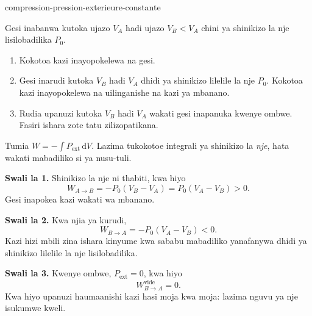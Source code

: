 \begin{exo}{compression-pression-exterieure-constante}

Gesi inabanwa kutoka ujazo $V_A$ hadi ujazo $V_B<V_A$ chini ya shinikizo la nje lisilobadilika $P_0$.

\begin{enumerate}
\item Kokotoa kazi inayopokelewa na gesi.
\item Gesi inarudi kutoka $V_B$ hadi $V_A$ dhidi ya shinikizo lilelile la nje $P_0$. Kokotoa kazi inayopokelewa na uilinganishe na kazi ya mbanano.
\item Rudia upanuzi kutoka $V_B$ hadi $V_A$ wakati gesi inapanuka kwenye ombwe. Fasiri ishara zote tatu zilizopatikana.
\end{enumerate}

\begin{indication}
Tumia $W=-\int P_{\mathrm{ext}}\,\mathrm{d}V$. Lazima tukokotoe integrali ya
shinikizo la \emph{nje}, hata wakati mabadiliko si ya nusu-tuli.
\end{indication}

\begin{solution}
\textbf{Swali la 1.} Shinikizo la nje ni thabiti, kwa hiyo
\[
W_{A\to B}=-P_0(V_B-V_A)=P_0(V_A-V_B)>0.
\]
Gesi inapokea kazi wakati wa mbanano.

\textbf{Swali la 2.} Kwa njia ya kurudi,
\[
W_{B\to A}=-P_0(V_A-V_B)<0.
\]
Kazi hizi mbili zina ishara kinyume kwa sababu mabadiliko yanafanywa dhidi
ya shinikizo lilelile la nje lisilobadilika.

\textbf{Swali la 3.} Kwenye ombwe, $P_{\mathrm{ext}}=0$, kwa hiyo
\[
W_{B\to A}^{\mathrm{vide}}=0.
\]
Kwa hiyo upanuzi haumaanishi kazi hasi moja kwa moja: lazima nguvu ya nje
isukumwe kweli.
\end{solution}
\end{exo}
